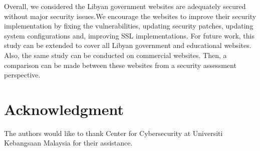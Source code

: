 \documentclass[conference,letterpaper]{IEEEtran}
\begin{document}
Overall, we considered the Libyan government websites are adequately
secured without major security issues.We encourage the
websites to improve their security implementation by fixing the
vulnerabilities, updating security patches, updating system
configurations and, improving SSL implementations. For future work, this study can be extended to cover all Libyan
government and educational websites. Also, the same study can be
conducted on commercial websites. Then, a comparison can be made
between these websites from a security assessment perspective.






\section*{Acknowledgment}


The authors would like to thank Center for Cybersecurity at Universiti
Kebangsaan Malaysia for their assistance.







%
%
%
%
%
%
%
\end{document}
